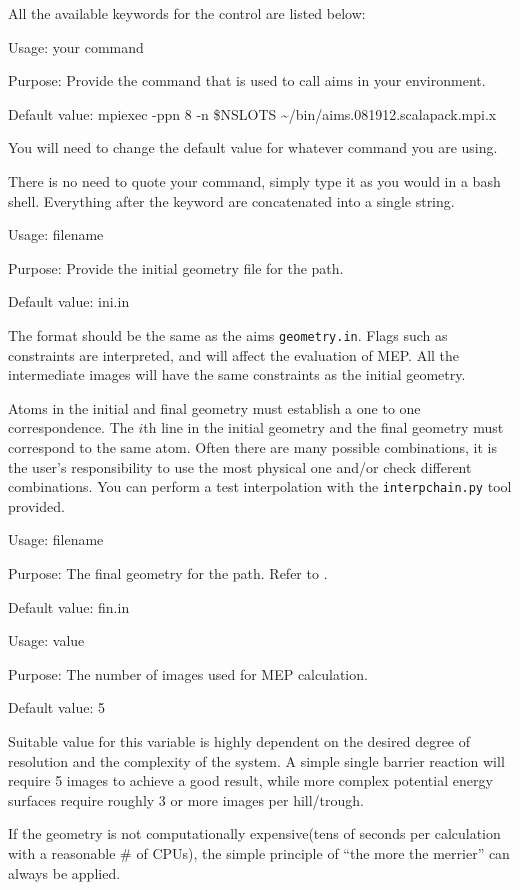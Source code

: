 All the available keywords for the control are listed below:

{
Usage:  your command

Purpose: Provide the command that is used to call aims in your environment. 

Default value: mpiexec -ppn 8 -n \$NSLOTS \textasciitilde/bin/aims.081912.scalapack.mpi.x
}
You will need to change the default value for whatever command you are using.

There is no need to quote your command, simply type it as you would in
a bash shell. Everything after the keyword are concatenated into a single
string. 


{
Usage:  filename


Purpose: Provide the initial geometry file for the path. 


Default value: ini.in
}
The format should be the same as the aims \texttt{geometry.in}. Flags such as constraints are interpreted, and will affect the evaluation of MEP. All the intermediate images will have the same constraints as the initial geometry. 

Atoms in the initial and final geometry must establish a one to one correspondence. The $i$th line in the initial geometry and the final geometry must correspond to the same atom. Often there are many possible combinations, it is the user's responsibility to use the most physical one and/or check different combinations. You can perform a test interpolation with the \texttt{interpchain.py} tool provided. 

{
Usage:  filename


Purpose: The final geometry for the path. Refer to .


Default value: fin.in
}

{
Usage:  value


Purpose: The number of images used for MEP calculation.


Default value: 5
}
 Suitable value for this variable is highly dependent on the desired degree of resolution and the complexity of the system. A simple single barrier reaction will require 5 images to achieve a good result, while more complex potential energy surfaces require roughly 3 or more images per hill/trough. 
 
 
 If the geometry is not computationally expensive(tens of seconds per calculation with a reasonable \# of CPUs), the simple principle of ``the more the merrier'' can always be applied. 
 
